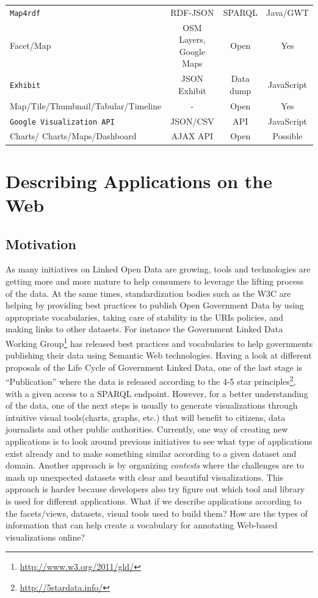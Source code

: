 \begin{landscape}
\begin{table}[htb!]
\begin{tabular}{lccc}
    \midrule
    \texttt{Map4rdf} & RDF-JSON & SPARQL & Java/GWT \\
    Facet/Map & OSM Layers, Google Maps & Open & Yes \\
    \midrule
    \texttt{Exhibit} & JSON Exhibit & Data dump & JavaScript \\
    Map/Tile/Thumbnail/Tabular/Timeline & \-- & Open & Yes \\
    \midrule
    \texttt{Google Visualization API} & JSON/CSV & API & JavaScript \\
    Charts/ Charts/Maps/Dashboard & AJAX API & Open & Possible \\
    \bottomrule
  \end{tabular}
\end{table}
\end{landscape}

\section{Describing Applications on the Web}
\label{sec:descApps}

\subsection{Motivation}
As many initiatives on Linked Open Data are growing, tools and technologies are getting more and more mature to help consumers to leverage the lifting process of the data. At the same times, standardization bodies such as the W3C are helping by providing best practices to publish Open Government Data by using appropriate vocabularies, taking care of stability in the URIs policies, and making links to other datasets. For instance the Government Linked Data Working Group\footnote{\url{http://www.w3.org/2011/gld/}} has released best practices and vocabularies to help governments publishing their data using Semantic Web technologies. Having a look at different proposals of the Life Cycle of Government Linked Data, one of the last stage is ``Publication'' where the data is released according to the 4-5 star principles\footnote{\url{http://5stardata.info/}}, with a given access to a SPARQL endpoint. However, for a better understanding of the data, one of the next steps is usually to generate visualizations through intuitive visual tools(charts, graphs, etc.) that will benefit to citizens, data journalists and other public authorities. Currently, one way of creating new applications is to look around previous initiatives to see what type of applications exist already and to make something similar according to a given dataset and domain. Another approach is by organizing \textit{contests} where the challenges are to mash up unexpected datasets with clear and beautiful visualizations. This approach is harder because developers also try figure out which tool and library is used for different applications. What if we describe applications according to the facets/views, datasets, visual tools used to build them? How are the types of information that can help create a vocabulary for annotating Web-based visualizations online?

